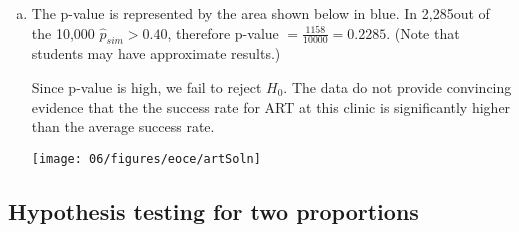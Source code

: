 {{\begin{enumerate}[(a)]
\item The p-value is represented by the area shown below in blue. In 2,285out of the 10,000 $\hat{p}_{sim} > 0.40$, therefore p-value $= \frac{1158}{10000} = 0.2285$. (Note that students may have approximate results.) 
\noindent \begin{minipage}[c]{0.5\textwidth}
Since p-value is high, we fail to reject $H_0$. The data do not provide convincing evidence that the the success rate for ART at this clinic is significantly higher than the average success rate.
\end{minipage}
\begin{minipage}[c]{0.5\textwidth}
\begin{center}
\texttt{[image: 06/figures/eoce/artSoln]}
\end{center}
\end{minipage}
\end{enumerate}
}
}

%

\subsection{Hypothesis testing for two proportions}

